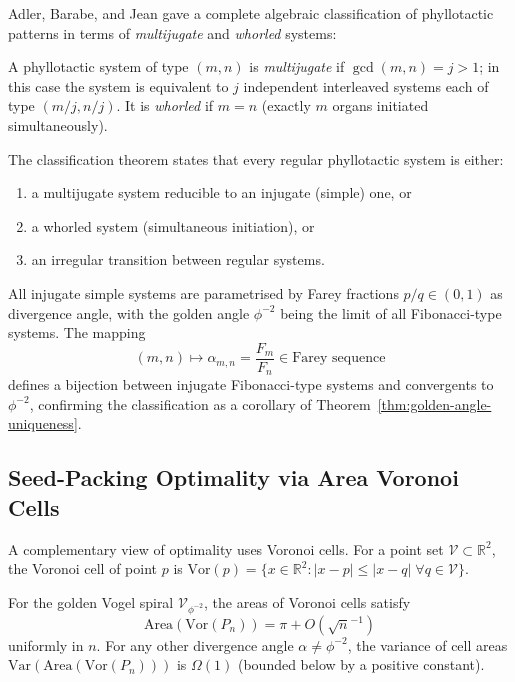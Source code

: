Adler, Barabe, and Jean \cite{adler1997phyllotaxis} gave a complete
algebraic classification of phyllotactic patterns in terms of
\emph{multijugate} and \emph{whorled} systems:

\begin{definition}\label{def:multijugate}
A phyllotactic system of type $(m,n)$ is \emph{multijugate} if
$\gcd(m,n) = j > 1$; in this case the system is equivalent to $j$
independent interleaved systems each of type $(m/j, n/j)$.  It is
\emph{whorled} if $m = n$ (exactly $m$ organs initiated simultaneously).
\end{definition}

The classification theorem states that every regular phyllotactic
system is either:
\begin{enumerate}
  \item a multijugate system reducible to an injugate (simple) one, or
  \item a whorled system (simultaneous initiation), or
  \item an irregular transition between regular systems.
\end{enumerate}

All injugate simple systems are parametrised by Farey fractions
$p/q \in (0,1)$ as divergence angle, with the golden angle $\phi^{-2}$
being the limit of all Fibonacci-type systems.  The mapping
\[
  (m, n) \mapsto \alpha_{m,n} = \frac{F_m}{F_n} \in \text{Farey sequence}
\]
defines a bijection between injugate Fibonacci-type systems and
convergents to $\phi^{-2}$, confirming the classification as a
corollary of Theorem~\ref{thm:golden-angle-uniqueness}.

\subsection{Seed-Packing Optimality via Area Voronoi Cells}
\label{subsec:voronoi}

A complementary view of optimality uses Voronoi cells.  For a point
set $\mathcal{V} \subset \mathbb{R}^2$, the Voronoi cell of point $p$
is $\text{Vor}(p) = \{x \in \mathbb{R}^2 : |x-p| \leq |x-q| \; \forall q \in \mathcal{V}\}$.

\begin{proposition}
\label{prop:voronoi}
For the golden Vogel spiral $\mathcal{V}_{\phi^{-2}}$, the areas of
Voronoi cells satisfy
\[
  \mathrm{Area}(\mathrm{Vor}(P_n)) = \pi + O(\sqrt{n}^{-1})
\]
uniformly in $n$.  For any other divergence angle $\alpha \neq \phi^{-2}$,
the variance of cell areas $\mathrm{Var}(\mathrm{Area}(\mathrm{Vor}(P_n)))$
is $\Omega(1)$ (bounded below by a positive constant).
\end{proposition}

